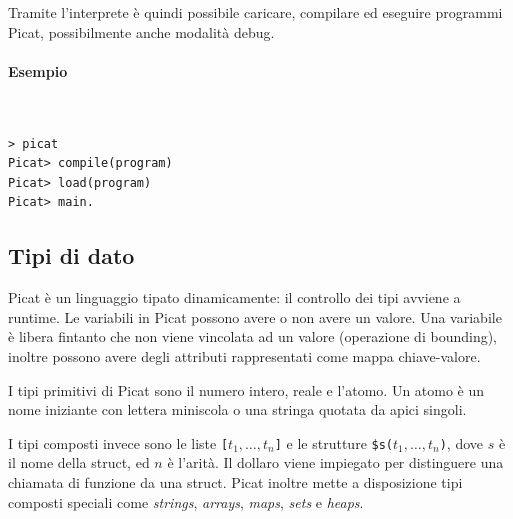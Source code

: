 \documentclass[12pt,a4paper,openright]{book} %
\begin{document}
Tramite l'interprete è quindi possibile caricare, compilare ed eseguire programmi Picat, possibilmente anche modalità debug.

\paragraph{Esempio}\
\begin{verbatim}
> picat
Picat> compile(program)
Picat> load(program)
Picat> main.
\end{verbatim}

\subsection{Tipi di dato}
\label{sec:picat_base_datatype}

Picat è un linguaggio tipato dinamicamente: il controllo dei tipi avviene a runtime. Le variabili in Picat possono avere o non avere un valore. Una variabile è libera fintanto che non viene vincolata ad un valore (operazione di bounding), inoltre possono avere degli attributi rappresentati come mappa chiave-valore.

I tipi primitivi di Picat sono il numero intero, reale e l'atomo. Un atomo è un nome iniziante con lettera miniscola o una stringa quotata da apici singoli.

I tipi composti invece sono le liste \verb|[|$t_1, \ldots, t_n$\verb|]| e le strutture \verb|$s(|$t_1, \ldots, t_n$\verb|)|, dove $s$ è il nome della struct, ed $n$ è l'arità. Il dollaro viene impiegato per distinguere una chiamata di funzione da una struct. Picat inoltre mette a disposizione tipi composti speciali come \emph{strings}, \emph{arrays}, \emph{maps}, \emph{sets} e \emph{heaps}.
\end{document}
